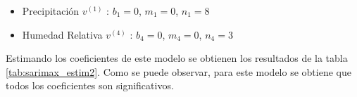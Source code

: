 \documentclass[12pt,oneside]{book}\usepackage[]{graphicx}\usepackage[]{color}
\newenvironment{knitrout}{}{} %
\theoremstyle{definition} %
\begin{document}
\begin{itemize}
\item Precipitación $v^{(1)}$ : $b_1= 0$, $m_1=0$, $n_1=8$
\item Humedad Relativa $v^{(4)}$ : $b_4= 0$, $m_4=0$, $n_4=3$
\end{itemize}


Estimando los coeficientes de este modelo se obtienen los resultados de la tabla \ref{tab:sarimax_estim2}. Como se puede observar, para este modelo se obtiene que todos los coeficientes son significativos. 


\begin{knitrout}
\color{fgcolor}\begin{table}


\end{table}
\end{knitrout}
\end{document}
